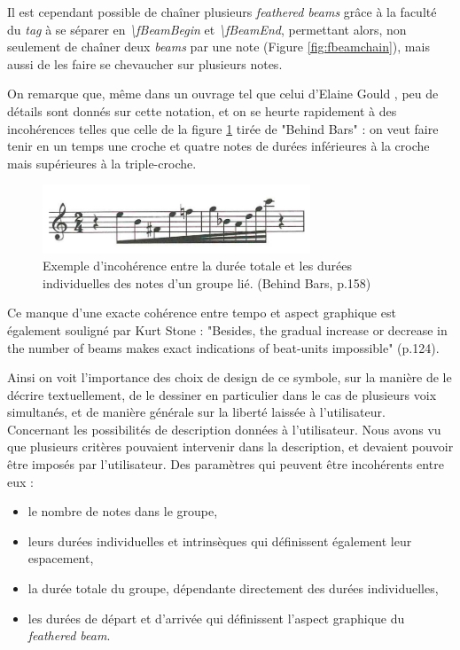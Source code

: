 \documentclass{article}
\begin{document}
Il est cependant possible de chaîner plusieurs \emph{feathered beams} grâce à la faculté du \emph{tag} à se séparer en \emph{\textbackslash{}fBeamBegin} et \emph{\textbackslash{}fBeamEnd}, permettant alors, non seulement de chaîner deux \emph{beams} par une note (Figure \ref{fig:fbeamchain}), mais aussi de les faire se chevaucher sur plusieurs notes.
\bigskip


On remarque que, même dans un ouvrage tel que celui d'Elaine Gould \cite{gould2011behind}, peu de détails sont donnés sur cette notation, et on se heurte rapidement à des incohérences telles que celle de la figure \ref{fig:incoherence} tirée de "Behind Bars" : on veut faire tenir en un temps une croche et quatre notes de durées inférieures à la croche mais supérieures à la triple-croche. 

\begin{figure}[h]
\centering
\includegraphics[width=8cm]{img/behindbars.jpg}
\caption{Exemple d'incohérence entre la durée totale et les durées individuelles des notes d'un groupe lié. (Behind Bars, p.158) }
\label{fig:incoherence}
\end{figure}

Ce manque d'une exacte cohérence entre tempo et aspect graphique est également souligné par Kurt Stone \cite{stone1980music} : "Besides, the gradual increase or decrease in the number of beams makes exact indications of beat-units impossible" (p.124).

Ainsi on voit l'importance des choix de design de ce symbole, sur la manière de le décrire textuellement, de le dessiner en particulier dans le cas de plusieurs voix simultanés, et de manière générale sur la liberté laissée à l'utilisateur.
\\

Concernant les possibilités de description données à l'utilisateur. Nous avons vu que plusieurs critères pouvaient intervenir dans la description, et devaient pouvoir être imposés par l'utilisateur. Des paramètres qui peuvent être incohérents entre eux :
\begin{itemize}
\item le nombre de notes dans le groupe,
\item leurs durées individuelles et intrinsèques qui définissent également leur espacement,
\item la durée totale du groupe, dépendante directement des durées individuelles,
\item les durées de départ et d'arrivée qui définissent l'aspect graphique du \emph{feathered beam}.
\end{itemize}
\bigskip
\end{document}
